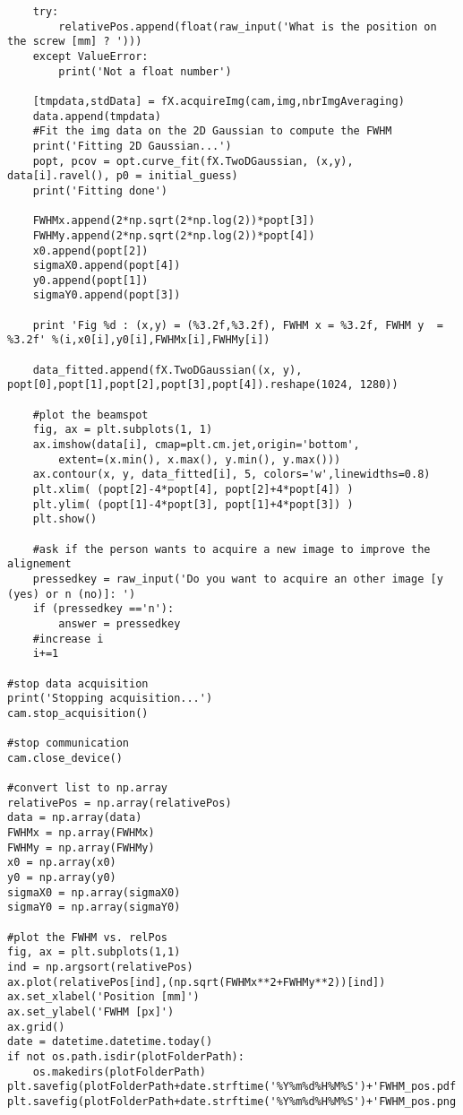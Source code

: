 \begin{lstlisting}
    try:
        relativePos.append(float(raw_input('What is the position on the screw [mm] ? ')))
    except ValueError:
        print('Not a float number')
        
    [tmpdata,stdData] = fX.acquireImg(cam,img,nbrImgAveraging)
    data.append(tmpdata)
    #Fit the img data on the 2D Gaussian to compute the FWHM
    print('Fitting 2D Gaussian...')
    popt, pcov = opt.curve_fit(fX.TwoDGaussian, (x,y), data[i].ravel(), p0 = initial_guess)
    print('Fitting done')

    FWHMx.append(2*np.sqrt(2*np.log(2))*popt[3])
    FWHMy.append(2*np.sqrt(2*np.log(2))*popt[4])
    x0.append(popt[2])
    sigmaX0.append(popt[4])
    y0.append(popt[1])
    sigmaY0.append(popt[3])

    print 'Fig %d : (x,y) = (%3.2f,%3.2f), FWHM x = %3.2f, FWHM y  = %3.2f' %(i,x0[i],y0[i],FWHMx[i],FWHMy[i])

    data_fitted.append(fX.TwoDGaussian((x, y), popt[0],popt[1],popt[2],popt[3],popt[4]).reshape(1024, 1280))

    #plot the beamspot
    fig, ax = plt.subplots(1, 1)
    ax.imshow(data[i], cmap=plt.cm.jet,origin='bottom',
        extent=(x.min(), x.max(), y.min(), y.max()))
    ax.contour(x, y, data_fitted[i], 5, colors='w',linewidths=0.8)
    plt.xlim( (popt[2]-4*popt[4], popt[2]+4*popt[4]) )
    plt.ylim( (popt[1]-4*popt[3], popt[1]+4*popt[3]) )
    plt.show()

    #ask if the person wants to acquire a new image to improve the alignement
    pressedkey = raw_input('Do you want to acquire an other image [y (yes) or n (no)]: ')
    if (pressedkey =='n'):
        answer = pressedkey
    #increase i
    i+=1

#stop data acquisition
print('Stopping acquisition...')
cam.stop_acquisition()

#stop communication
cam.close_device()

#convert list to np.array
relativePos = np.array(relativePos)
data = np.array(data)
FWHMx = np.array(FWHMx)
FWHMy = np.array(FWHMy)
x0 = np.array(x0)
y0 = np.array(y0)
sigmaX0 = np.array(sigmaX0)
sigmaY0 = np.array(sigmaY0)

#plot the FWHM vs. relPos
fig, ax = plt.subplots(1,1)
ind = np.argsort(relativePos)
ax.plot(relativePos[ind],(np.sqrt(FWHMx**2+FWHMy**2))[ind])
ax.set_xlabel('Position [mm]')
ax.set_ylabel('FWHM [px]')
ax.grid()
date = datetime.datetime.today()
if not os.path.isdir(plotFolderPath):
    os.makedirs(plotFolderPath)
plt.savefig(plotFolderPath+date.strftime('%Y%m%d%H%M%S')+'FWHM_pos.pdf')
plt.savefig(plotFolderPath+date.strftime('%Y%m%d%H%M%S')+'FWHM_pos.png')



\end{lstlisting}
